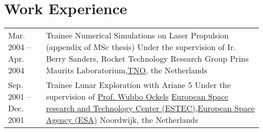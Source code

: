 \documentclass[a4paper]{article}
\newcommand{\procv}[2]{\iftoggle{professionalcv}{#1}{#2}}
\newlength{\listskipbig}
\newenvironment{cvsection}[2]{
  \vspace{0.15in}
  \section*{#1}
  \vspace{-0.2in}
  \begin{longtable}{lp{#2}}
}{
  \end{longtable}
}
\begin{document}
\begin{cvsection}{Work Experience}{10.8cm}
Mar. 2004 -- Apr. 2004
  & Trainee\newline
    Numerical Simulations on Laser Propulsion (appendix of MSc thesis)\newline
    Under the supervision of Ir. Berry Sanders, Rocket Technology Research Group\newline
    Prins Maurits Laboratorium,\href{http://www.tno.nl/}{TNO}, the Netherlands\\[\listskipbig]

Sep. 2001 -- Dec. 2001
  & Trainee\newline
    Lunar Exploration with Ariane 5\newline
    Under the supervision of \href{https://en.wikipedia.org/wiki/Wubbo_Ockels}{Prof. Wubbo Ockels}\newline
    \href{http://www.esa.int/About_Us/ESTEC}{European Space research and Technology Center (ESTEC)},\href{http://www.esa.int}{European Space Agency (ESA)}
    Noordwijk, the Netherlands\\[\listskipbig]

\end{cvsection}


\procv{}{
\begin{cvsection}{Research}{11cm}
Satellite accelerometry & $\bullet$ Combination of orbit-derived non-gravitational accelerations with accelerometer observations in the context of the Swarm satellite mission\\[\listskipbig]
Space Geodesy & $\bullet$ Gravity field models from Swarm kinematic orbits\newline
                $\bullet$ Impact of orbit position errors in the quality of gravimetric data from satellite formations\newline
                $\bullet$ Noise budget of low-low satellite-to-satellite tracking gravimetric data\newline
                $\bullet$ Retrieval of the high-frequency time-variable gravity field of the Earth with numerous satellites\\[\listskipbig]
Laser Propulsion & $\bullet$ Use of ground-based lasers to launch small satellites to orbit\\[\listskipbig]
Single Stage to Orbit & $\bullet$ Determination of the minimum technological requirements for a single stage to orbit launcher\\[\listskipbig]
\end{cvsection}
}
\end{document}

